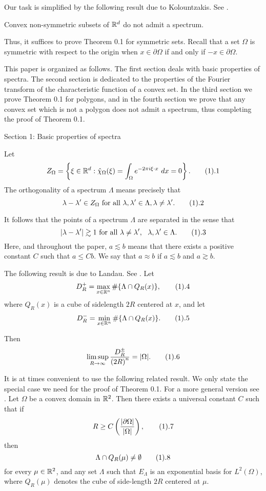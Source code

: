 Our task is simplified by the following result due to
Kolountzakis. See \cite{Kol99}.

 Convex non-symmetric subsets of ${\Bbb
R}^d$ do not admit a spectrum.
\endproclaim

Thus, it suffices to prove Theorem 0.1 for symmetric sets.
Recall that a set $\Omega$ is symmetric with respect to the
origin when $x \in \partial \Omega$ if and only if $-x \in
\partial \Omega$.

This paper is organized as follows. The first section deals with
basic properties of spectra. The second section is dedicated to
the properties of the Fourier transform of the characteristic
function of a convex set. In the third section we prove Theorem
0.1 for polygons, and in the fourth section we prove that any
convex set which is not a polygon does not admit a spectrum,
thus completing the proof of Theorem 0.1.

\head Section 1: Basic properties of spectra \endhead

Let
$$Z_{\Omega}= \left\{\xi \in \Bbb R^d: \hat \chi_{\Omega}(\xi)=
\int_\Omega e^{-2\pi i \xi \cdot x}\ dx=0 \right\}. \tag1.1$$
The orthogonality of a spectrum $\Lambda$ means precisely that
$$ \lambda - \lambda' \in Z_\Omega \hbox{ for all } \lambda,
\lambda' \in \Lambda, \lambda \neq \lambda'.  \tag1.2$$

It follows that the points of a spectrum $\Lambda$ are separated
in the sense that $$ |\lambda-\lambda'| \gtrsim 1 \ \text{for
all } \lambda \not=\lambda', \ \ \lambda, \lambda' \in \Lambda.
\tag1.3$$ Here, and throughout the paper, $a \lesssim b$ means
that there exists a positive constant $C$ such that $a \leq Cb$.
We say that $a \approx b$ if $a \lesssim b$ and $a \gtrsim b$.

The following result is due to Landau. See \cite{Lan67}. Let
$$ D_R^{+}= \max_{x \in {\Bbb R}^n} \# \{ \Lambda \cap Q_R(x)\}, \tag1.4$$
where $Q_R(x)$ is a cube of sidelength $2R$ centered at $x$, and
let $$ D_R^{-}= \min_{x \in {\Bbb R}^n}\#\{ \Lambda \cap
Q_R(x)\}. \tag1.5$$

Then
$$ \limsup_{R \rightarrow \infty} \frac{D_R^{\pm}}{{(2R)}^n} =
|\Omega|. \tag1.6$$

It is at times convenient to use the following related result.
We only state the special case we need for the proof of Theorem
0.1. For a more general version see \cite{IosPed99}.
 Let $\Omega$ be a convex domain in ${\Bbb
R}^2$. Then there exists a universal constant $C$ such that if
$$ R \ge C
\left(\frac{{|\partial \Omega|}}{|\Omega|}\right), \tag1.7$$ then
$$ \Lambda \cap Q_R(\mu) \not= \emptyset \tag1.8$$ for every
$\mu \in {\Bbb R}^2$, and any set $\Lambda$ such that
$E_{\Lambda}$ is an exponential basis for $L^2(\Omega)$, where
$Q_R(\mu)$ denotes the cube of side-length $2R$ centered at
$\mu$. \endproclaim


